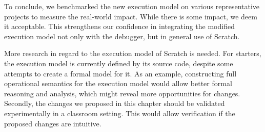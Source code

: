 \documentclass[main]{subfiles}
\begin{document}
To conclude, we benchmarked the new execution model on various representative projects to measure the real-world impact.
While there is some impact, we deem it acceptable.
This strengthens our confidence in integrating the modified execution model not only with the debugger, but in general use of Scratch.

More research in regard to the execution model of Scratch is needed.
For starters, the execution model is currently defined by its source code, despite some attempts to create a formal model for it.
As an example, constructing full operational semantics for the execution model would allow better formal reasoning and analysis, which might reveal more opportunities for changes.
Secondly, the changes we proposed in this chapter should be validated experimentally in a classroom setting.
This would allow verification if the proposed changes are intuitive.
\end{document}
